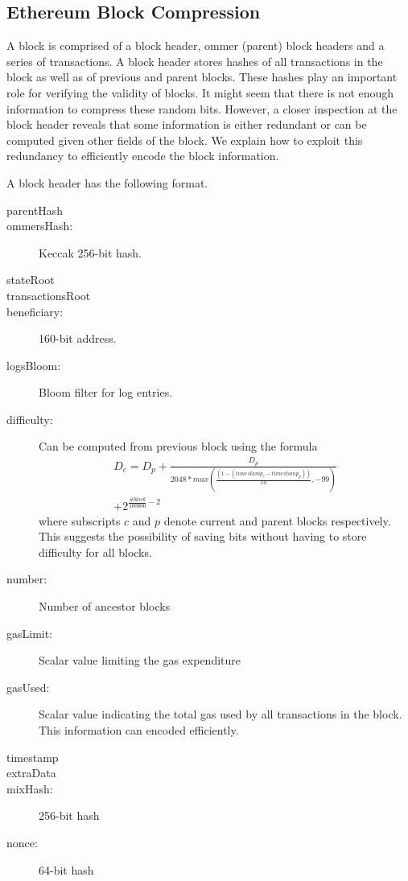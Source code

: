 \subsection{Ethereum Block Compression}\label{sec:blockcompress}

A block is comprised of a block header, ommer (parent) block headers and a series of transactions. 
A block header stores hashes of all transactions in the block as well as of previous and parent blocks.
These hashes play an important role for verifying the validity of blocks.
It might seem that there is not enough information to compress these random bits. 
However, a closer inspection at the block header reveals that 
some information is either redundant or can be computed given other fields of the block.
We explain how to exploit this redundancy to efficiently encode the block information.

A block header has the following format. 
\begin{description}
 \item[parentHash] 
 \item[ommersHash:]  Keccak 256-bit hash.
 \item[stateRoot]  
 \item[transactionsRoot]
 \item[beneficiary:]160-bit address.
 \item[logsBloom:] Bloom filter for log entries.
 \item[difficulty:] Can be computed from previous block using the formula
	\begin{multline*}
	D_{c} = D_{p} + \frac{D_{p}}{2048 * max(\frac{(1 - (timestamp_{c} - timestamp_{p}))}{10}, -99)}\\ + 2^{\frac{\#block}{100000} - 2}
        \end{multline*}
	where subscripts $c$ and $p$ denote current and parent blocks respectively. 
 This suggests the possibility of saving bits without having to store difficulty for all blocks.
 \item[number:] Number of ancestor blocks
 \item[gasLimit:] Scalar value limiting the gas expenditure
 \item[gasUsed:] Scalar value indicating the total gas used by all transactions in the block. This information can encoded efficiently.
 \item[timestamp]
 \item[extraData]
 \item[mixHash:] 256-bit hash
 \item[nonce:] 64-bit hash
\end{description}

